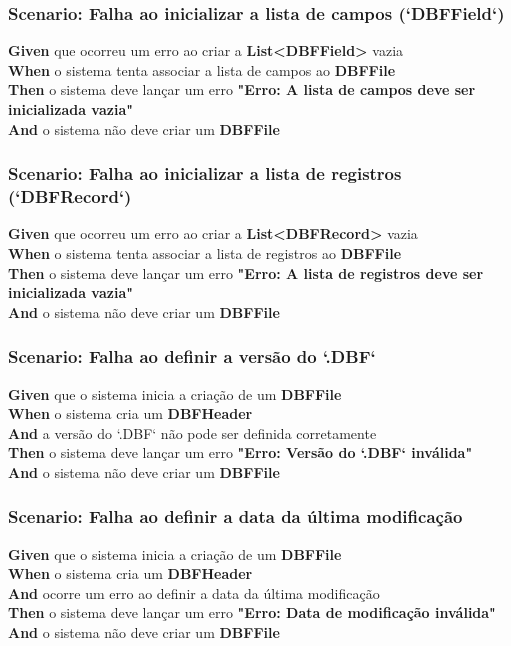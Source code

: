 \subsubsection{Scenario: Falha ao inicializar a lista de campos (`DBFField`)}
\textbf{Given} que ocorreu um erro ao criar a \textbf{List<DBFField>} vazia \\
\textbf{When} o sistema tenta associar a lista de campos ao \textbf{DBFFile} \\
\textbf{Then} o sistema deve lançar um erro \textbf{"Erro: A lista de campos deve ser inicializada vazia"} \\
\textbf{And} o sistema não deve criar um \textbf{DBFFile} \\

\subsubsection{Scenario: Falha ao inicializar a lista de registros (`DBFRecord`)}
\textbf{Given} que ocorreu um erro ao criar a \textbf{List<DBFRecord>} vazia \\
\textbf{When} o sistema tenta associar a lista de registros ao \textbf{DBFFile} \\
\textbf{Then} o sistema deve lançar um erro \textbf{"Erro: A lista de registros deve ser inicializada vazia"} \\
\textbf{And} o sistema não deve criar um \textbf{DBFFile} \\

\subsubsection{Scenario: Falha ao definir a versão do `.DBF`}
\textbf{Given} que o sistema inicia a criação de um \textbf{DBFFile} \\
\textbf{When} o sistema cria um \textbf{DBFHeader} \\
\textbf{And} a versão do `.DBF` não pode ser definida corretamente \\
\textbf{Then} o sistema deve lançar um erro \textbf{"Erro: Versão do `.DBF` inválida"} \\
\textbf{And} o sistema não deve criar um \textbf{DBFFile} \\

\subsubsection{Scenario: Falha ao definir a data da última modificação}
\textbf{Given} que o sistema inicia a criação de um \textbf{DBFFile} \\
\textbf{When} o sistema cria um \textbf{DBFHeader} \\
\textbf{And} ocorre um erro ao definir a data da última modificação \\
\textbf{Then} o sistema deve lançar um erro \textbf{"Erro: Data de modificação inválida"} \\
\textbf{And} o sistema não deve criar um \textbf{DBFFile} \\

